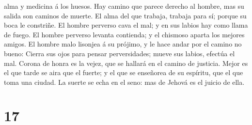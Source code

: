 alma y medicina á los huesos.  Hay camino que parece
derecho al hombre, mas su salida son caminos de muerte.  El
alma del que trabaja, trabaja para sí; porque su boca le constriñe.
 El hombre perverso cava el mal; y en sus labios hay como
llama de fuego.  El hombre perverso levanta contienda; y el
chismoso aparta los mejores amigos.  El hombre malo
lisonjea á su prójimo, y le hace andar por el camino no bueno:
 Cierra sus ojos para pensar perversidades; mueve sus
labios, efectúa el mal.  Corona de honra es la vejez, que
se hallará en el camino de justicia.  Mejor es el que tarde
se aira que el fuerte; y el que se enseñorea de su espíritu, que el que
toma una ciudad.  La suerte se echa en el seno: mas de
Jehová es el juicio de ella.

\hypertarget{section-16}{%
\section{17}\label{section-16}}

